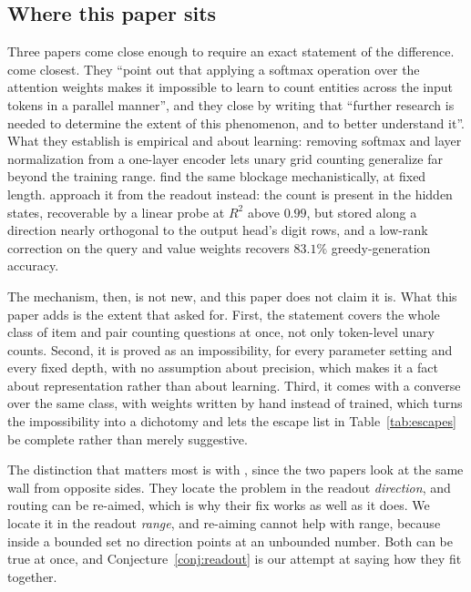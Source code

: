 \documentclass[10pt]{article}
\theoremstyle{definition}
\begin{document}
\subsection{Where this paper sits}
\label{sec:related-position}

Three papers come close enough to require an exact statement of the
difference. \citet{ouellette2023counting} come closest. They ``point out
that applying a softmax operation over the attention weights makes it
impossible to learn to count entities across the input tokens in a parallel
manner'', and they close by writing that ``further research is needed to
determine the extent of this phenomenon, and to better understand it''.
What they establish is empirical and about learning: removing softmax and
layer normalization from a one-layer encoder lets unary grid counting
generalize far beyond the training range. \citet{cagnetta2024small} find
the same blockage mechanistically, at fixed length.
\citet{garcia2026direction} approach it from the readout instead: the count
is present in the hidden states, recoverable by a linear probe at $R^2$
above $0.99$, but stored along a direction nearly orthogonal to the output
head's digit rows, and a low-rank correction on the query and value weights
recovers $83.1\%$ greedy-generation accuracy.

The mechanism, then, is not new, and this paper does not claim it is. What
this paper adds is the extent that \citet{ouellette2023counting} asked for.
First, the statement covers the whole class of item and pair counting
questions at once, not only token-level unary counts. Second, it is proved
as an impossibility, for every parameter setting and every fixed depth,
with no assumption about precision, which makes it a fact about
representation rather than about learning. Third, it comes with a converse
over the same class, with weights written by hand instead of trained, which
turns the impossibility into a dichotomy and lets the escape list in
Table~\ref{tab:escapes} be complete rather than merely suggestive.

The distinction that matters most is with \citet{garcia2026direction},
since the two papers look at the same wall from opposite sides. They locate
the problem in the readout \emph{direction}, and routing can be re-aimed,
which is why their fix works as well as it does. We locate it in the
readout \emph{range}, and re-aiming cannot help with range, because inside
a bounded set no direction points at an unbounded number. Both can be true
at once, and Conjecture~\ref{conj:readout} is our attempt at saying how
they fit together.
\end{document}
